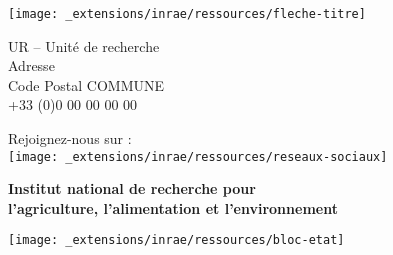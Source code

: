 
\thispagestyle{empty}


\begin{center}

\color{inrae}

\vspace*{10cm}

\texttt{[image: \_extensions/inrae/ressources/fleche-titre]}\par

\sffamily
UR -- Unité de recherche\\
Adresse\\
Code Postal COMMUNE\\
+33 (0)0 00 00 00 00\par\bigskip

Rejoignez-nous sur :\\
\texttt{[image: \_extensions/inrae/ressources/reseaux-sociaux]}\par\bigskip

\vspace*{2cm}

{\bfseries Institut national de recherche pour\\
l'agriculture, l'alimentation et l'environnement}\par\bigskip

\texttt{[image: \_extensions/inrae/ressources/bloc-etat]}\par

\end{center}

\restoregeometry
